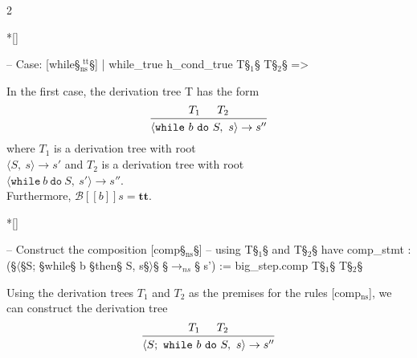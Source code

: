 \begin{paracol}{2}
\begin{rightcolumn}
\end{rightcolumn}
\switchcolumn[1]*[]
\begin{leftcolumn}
    \begin{Lean_Code}
  -- Case: [while§\color{green!40!black}$_{\text{ns}}^{\text{\ tt}}$§]
  | while_true
    h_cond_true T§$_1$§ T§$_2$§ =>
    \end{Lean_Code}
\end{leftcolumn}
\begin{rightcolumn} \noindent
In the first case, the derivation tree T has the form
\[
    \begin{prooftree}
        \hypo{T_1}
        \hypo{T_2}
        \infer[
            ]2{
            \langle \mathtt{while}\ b\ \mathtt{do}\ S,\ s\rangle \to s''
            }
    \end{prooftree}
\]
where \(T_1\) is a derivation tree with root \\
\(\langle S,\ s\rangle \to s'\) and \(T_2\) is a derivation tree
with root \\
\(\langle \mathtt{while}\ b\ \mathtt{do}\ S,\ s'\rangle \to s''\). \\
Furthermore, \(\mathcal{B}[\![b]\!]s = \mathbf{tt}\).
\end{rightcolumn}
\vspace{1.5em}

\switchcolumn[1]*[]
\begin{leftcolumn}
    \begin{Lean_Code}
    -- Construct the composition [comp§\color{green!40!black}$_{\text{ns}}$§]
    -- using T§\color{green!40!black}$_1$§ and T§\color{green!40!black}$_2$§
    have comp_stmt :
      (§\(\langle\)§S; §while§ b §then§ S, s§\(\rangle\)§
      §\(\to_{ns}\)§ s') :=
      big_step.comp T§$_1$§ T§$_2$§
    \end{Lean_Code}
\end{leftcolumn}

\begin{rightcolumn} \noindent
Using the derivation trees \(T_1\) and \(T_2\) as the premises for the rules [comp$_{\text{ns}}$], we can construct the derivation tree
\[
    \begin{prooftree}
        \hypo{T_1}
        \hypo{T_2}
        \infer[
            ]2{
            \langle S;\ \mathtt{while}\ b\ \mathtt{do}\ S,\ s\rangle \to s''
            }
    \end{prooftree}
\]
\end{rightcolumn}
\vspace{1.5em}


\end{paracol}
